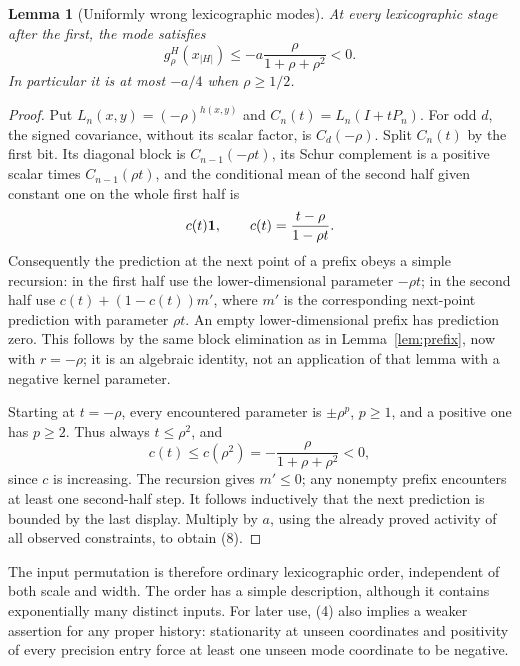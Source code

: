 \documentclass[11pt]{article}
\newtheorem{lemma}[theorem]{Lemma}
\begin{document}
\begin{lemma}[Uniformly wrong lexicographic modes]\label{lem:mode}
At every lexicographic stage after the first, the mode satisfies
\[
       g^H_\rho(x_{|H|})
            \le -a\frac{\rho}{1+\rho+\rho^2}<0.                \tag{8}
\]
In particular it is at most $-a/4$ when $\rho\ge1/2$.
\end{lemma}
\begin{proof}
Put $L_n(x,y)=(-\rho)^{h(x,y)}$ and $C_n(t)=L_n(I+tP_n)$.
For odd $d$, the signed covariance, without its scalar factor,
is $C_d(-\rho)$. Split $C_n(t)$ by the first bit. Its diagonal block
is $C_{n-1}(-\rho t)$, its Schur complement is a positive scalar
times $C_{n-1}(\rho t)$, and the conditional mean of the second half
given constant one on the whole first half is
\[
                         c(t)\mathbf1,
              \qquad c(t)=\frac{t-\rho}{1-\rho t}.
\]
Consequently the prediction at the next point of a prefix obeys a
simple recursion: in the first half use the lower-dimensional
parameter $-\rho t$; in the second half use
$c(t)+(1-c(t))m'$, where $m'$ is the corresponding next-point prediction
with parameter $\rho t$. An empty lower-dimensional prefix has
prediction zero. This follows by the same block elimination as in
Lemma~\ref{lem:prefix}, now with $r=-\rho$; it is an algebraic identity,
not an application of that lemma with a negative kernel parameter.

Starting at $t=-\rho$, every encountered parameter is
$\pm\rho^p$, $p\ge1$, and a positive one has $p\ge2$.
Thus always $t\le\rho^2$, and
\[
 c(t)\le c(\rho^2)
       =-\frac{\rho}{1+\rho+\rho^2}<0,
\]
since $c$ is increasing. The recursion gives $m'\le0$;
any nonempty prefix encounters at least one second-half step.
It follows inductively that the next prediction is bounded by the
last display. Multiply by $a$, using the already proved activity
of all observed constraints, to obtain (8).
\end{proof}
The input permutation is therefore ordinary lexicographic order,
independent of both scale and width. The order has a simple description,
although it contains exponentially many distinct inputs.
For later use, (4) also implies a weaker assertion for any proper history:
stationarity at unseen coordinates and positivity of every precision
entry force at least one unseen mode coordinate to be negative.
\end{document}
